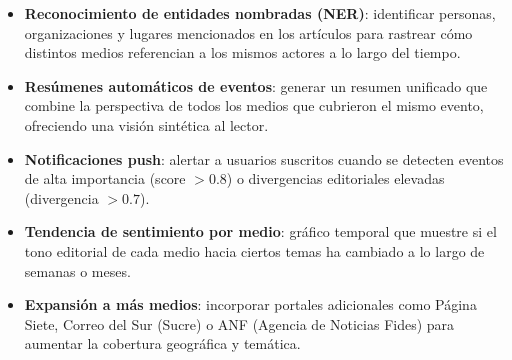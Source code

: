\documentclass[12pt,a4paper]{article}
\begin{document}
\begin{itemize}[nosep]
  \item \textbf{Reconocimiento de entidades nombradas (NER)}: identificar personas, organizaciones y lugares mencionados en los artículos para rastrear cómo distintos medios referencian a los mismos actores a lo largo del tiempo.

  \item \textbf{Resúmenes automáticos de eventos}: generar un resumen unificado que combine la perspectiva de todos los medios que cubrieron el mismo evento, ofreciendo una visión sintética al lector.

  \item \textbf{Notificaciones push}: alertar a usuarios suscritos cuando se detecten eventos de alta importancia (score $> 0.8$) o divergencias editoriales elevadas (divergencia $> 0.7$).

  \item \textbf{Tendencia de sentimiento por medio}: gráfico temporal que muestre si el tono editorial de cada medio hacia ciertos temas ha cambiado a lo largo de semanas o meses.

  \item \textbf{Expansión a más medios}: incorporar portales adicionales como Página Siete, Correo del Sur (Sucre) o ANF (Agencia de Noticias Fides) para aumentar la cobertura geográfica y temática.
\end{itemize}
\end{document}
